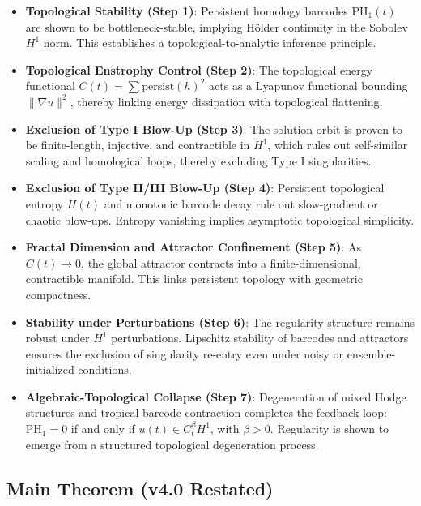 \documentclass[11pt]{article}
\theoremstyle{definition}
\begin{document}
\begin{itemize}
    \item \textbf{Topological Stability (Step 1)}: Persistent homology barcodes $\mathrm{PH}_1(t)$ are shown to be bottleneck-stable, implying H\"older continuity in the Sobolev $H^1$ norm. This establishes a topological-to-analytic inference principle.

    \item \textbf{Topological Enstrophy Control (Step 2)}: The topological energy functional $C(t) = \sum \mathrm{persist}(h)^2$ acts as a Lyapunov functional bounding $\|\nabla u\|^2$, thereby linking energy dissipation with topological flattening.

    \item \textbf{Exclusion of Type I Blow-Up (Step 3)}: The solution orbit is proven to be finite-length, injective, and contractible in $H^1$, which rules out self-similar scaling and homological loops, thereby excluding Type I singularities.

    \item \textbf{Exclusion of Type II/III Blow-Up (Step 4)}: Persistent topological entropy $H(t)$ and monotonic barcode decay rule out slow-gradient or chaotic blow-ups. Entropy vanishing implies asymptotic topological simplicity.

    \item \textbf{Fractal Dimension and Attractor Confinement (Step 5)}: As $C(t) \to 0$, the global attractor contracts into a finite-dimensional, contractible manifold. This links persistent topology with geometric compactness.

    \item \textbf{Stability under Perturbations (Step 6)}: The regularity structure remains robust under $H^1$ perturbations. Lipschitz stability of barcodes and attractors ensures the exclusion of singularity re-entry even under noisy or ensemble-initialized conditions.

    \item \textbf{Algebraic-Topological Collapse (Step 7)}: Degeneration of mixed Hodge structures and tropical barcode contraction completes the feedback loop: $\mathrm{PH}_1 = 0$ if and only if $u(t) \in C_t^\beta H^1$, with $\beta > 0$. Regularity is shown to emerge from a structured topological degeneration process.
\end{itemize}

\subsection*{Main Theorem (v4.0 Restated)}
\end{document}
